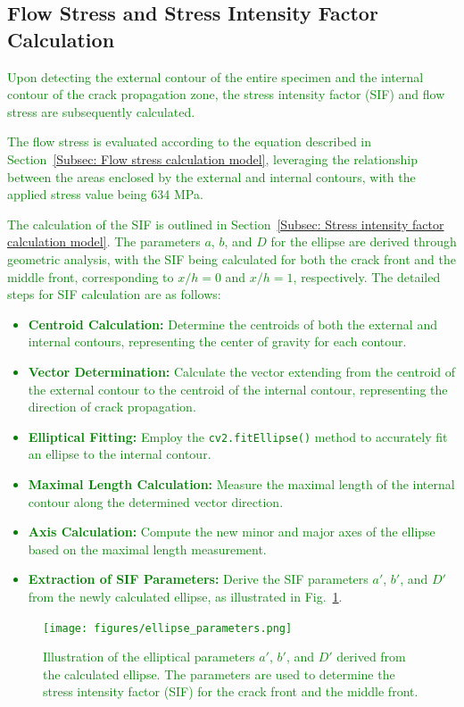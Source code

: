 \documentclass[preprint,12pt]{elsarticle}
\begin{document}
\subsection{Flow Stress and Stress Intensity Factor Calculation}
\label{subsec:FlowStressSIFCalculation}
\textcolor{green}{
Upon detecting the external contour of the entire specimen and the internal contour of the crack propagation zone, the stress intensity factor (SIF) and flow stress are subsequently calculated.

The flow stress is evaluated according to the equation described in Section~\ref{Subsec: Flow stress calculation model}, leveraging the relationship between the areas enclosed by the external and internal contours, with the applied stress value being 634 MPa.

The calculation of the SIF is outlined in Section~\ref{Subsec: Stress intensity factor calculation model}. The parameters \(a\), \(b\), and \(D\) for the ellipse are derived through geometric analysis, with the SIF being calculated for both the crack front and the middle front, corresponding to \(x/h = 0\) and \(x/h = 1\), respectively.
The detailed steps for SIF calculation are as follows:

\begin{itemize}
    \item \textbf{Centroid Calculation:} Determine the centroids of both the external and internal contours, representing the center of gravity for each contour.
    \item \textbf{Vector Determination:} Calculate the vector extending from the centroid of the external contour to the centroid of the internal contour, representing the direction of crack propagation.
    \item \textbf{Elliptical Fitting:} Employ the \texttt{cv2.fitEllipse()} method to accurately fit an ellipse to the internal contour.
    \item \textbf{Maximal Length Calculation:} Measure the maximal length of the internal contour along the determined vector direction.
    \item \textbf{Axis Calculation:} Compute the new minor and major axes of the ellipse based on the maximal length measurement.
    \item \textbf{Extraction of SIF Parameters:} Derive the SIF parameters \(a'\), \(b'\), and \(D'\) from the newly calculated ellipse, as illustrated in Fig.~\ref{fig:ellipse_parameters}.
\end{itemize}

\begin{figure}[h]
    \centering
    \texttt{[image: figures/ellipse\_parameters.png]}
    \caption{Illustration of the elliptical parameters \(a'\), \(b'\), and \(D'\) derived from the calculated ellipse. The parameters are used to determine the stress intensity factor (SIF) for the crack front and the middle front.}
    \label{fig:ellipse_parameters}
\end{figure}


}
\end{document}
